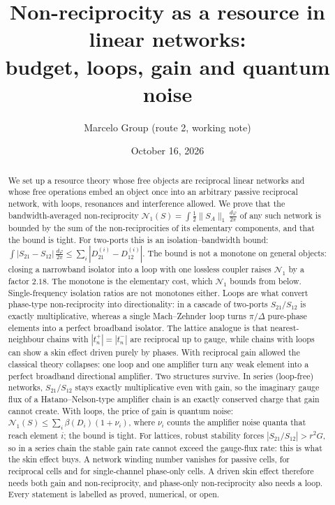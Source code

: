 \documentclass[11pt]{article}
\title{Non-reciprocity as a resource in linear networks:\\ budget, loops, gain and quantum noise}
\author{Marcelo Group \quad (route 2, working note)}
\date{October 16, 2026}
\theoremstyle{definition}
\theoremstyle{remark}
\newcommand{\NN}{\mathcal N_1}
\begin{document}
\maketitle

\begin{abstract}
We set up a resource theory whose free objects are reciprocal linear networks and whose free operations embed an object once into an arbitrary passive reciprocal network, with loops, resonances and interference allowed. We prove that the bandwidth-averaged non-reciprocity $\NN(S)=\int\frac12\|S_A\|_1\,\frac{d\varphi}{2\pi}$ of any such network is bounded by the sum of the non-reciprocities of its elementary components, and that the bound is tight. For two-ports this is an isolation--bandwidth bound: $\int|S_{21}-S_{12}|\,\frac{d\varphi}{2\pi}\le\sum_i|D^{(i)}_{21}-D^{(i)}_{12}|$. The bound is not a monotone on general objects: closing a narrowband isolator into a loop with one lossless coupler raises $\NN$ by a factor $2.18$. The monotone is the elementary cost, which $\NN$ bounds from below. Single-frequency isolation ratios are not monotones either. Loops are what convert phase-type non-reciprocity into directionality: in a cascade of two-ports $S_{21}/S_{12}$ is exactly multiplicative, whereas a single Mach--Zehnder loop turns $\pi/\Delta$ pure-phase elements into a perfect broadband isolator. The lattice analogue is that nearest-neighbour chains with $|t^+_n|=|t^-_n|$ are reciprocal up to gauge, while chains with loops can show a skin effect driven purely by phases. With reciprocal gain allowed the classical theory collapses: one loop and one amplifier turn any weak element into a perfect broadband directional amplifier. Two structures survive. In series (loop-free) networks, $S_{21}/S_{12}$ stays exactly multiplicative even with gain, so the imaginary gauge flux of a Hatano--Nelson-type amplifier chain is an exactly conserved charge that gain cannot create. With loops, the price of gain is quantum noise: $\NN(S)\le\sum_i\beta(D_i)(1+\nu_i)$, where $\nu_i$ counts the amplifier noise quanta that reach element $i$; the bound is tight. For lattices, robust stability forces $|S_{21}/S_{12}|>r^2G$, so in a series chain the stable gain rate cannot exceed the gauge-flux rate: this is what the skin effect buys. A network winding number vanishes for passive cells, for reciprocal cells and for single-channel phase-only cells. A driven skin effect therefore needs both gain and non-reciprocity, and phase-only non-reciprocity also needs a loop. Every statement is labelled as proved, numerical, or open.
\end{abstract}
\end{document}
